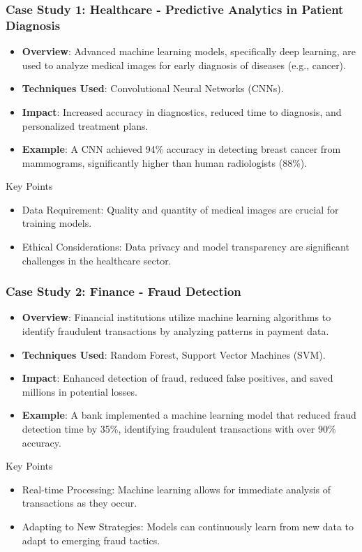 \documentclass[aspectratio=169]{beamer}
\begin{document}
\begin{frame}[fragile]
  \frametitle{Case Study 1: Healthcare - Predictive Analytics in Patient Diagnosis}
  \begin{itemize}
    \item \textbf{Overview}: Advanced machine learning models, specifically deep learning, are used to analyze medical images for early diagnosis of diseases (e.g., cancer).
    \item \textbf{Techniques Used}: Convolutional Neural Networks (CNNs).
    \item \textbf{Impact}: Increased accuracy in diagnostics, reduced time to diagnosis, and personalized treatment plans.
    \item \textbf{Example}: A CNN achieved 94\% accuracy in detecting breast cancer from mammograms, significantly higher than human radiologists (88\%).
  \end{itemize}
  
  \begin{block}{Key Points}
    \begin{itemize}
      \item Data Requirement: Quality and quantity of medical images are crucial for training models.
      \item Ethical Considerations: Data privacy and model transparency are significant challenges in the healthcare sector.
    \end{itemize}
  \end{block}
\end{frame}

\begin{frame}[fragile]
  \frametitle{Case Study 2: Finance - Fraud Detection}
  \begin{itemize}
    \item \textbf{Overview}: Financial institutions utilize machine learning algorithms to identify fraudulent transactions by analyzing patterns in payment data.
    \item \textbf{Techniques Used}: Random Forest, Support Vector Machines (SVM).
    \item \textbf{Impact}: Enhanced detection of fraud, reduced false positives, and saved millions in potential losses.
    \item \textbf{Example}: A bank implemented a machine learning model that reduced fraud detection time by 35\%, identifying fraudulent transactions with over 90\% accuracy.
  \end{itemize}
  
  \begin{block}{Key Points}
    \begin{itemize}
      \item Real-time Processing: Machine learning allows for immediate analysis of transactions as they occur.
      \item Adapting to New Strategies: Models can continuously learn from new data to adapt to emerging fraud tactics.
    \end{itemize}
  \end{block}
\end{frame}
\end{document}

